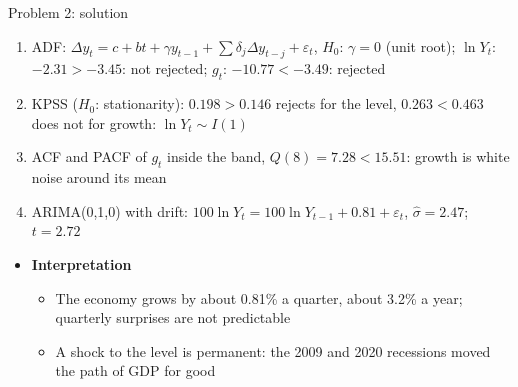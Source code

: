 \begin{frame}{Problem 2: solution}
\itemsize{\footnotesize}
\begin{enumerate}
    \item ADF: $\Delta y_t = c + bt + \gamma y_{t-1} + \sum\delta_j\Delta y_{t-j} + \varepsilon_t$, $H_0$: $\gamma = 0$ (unit root); $\ln Y_t$: $\ensuremath{-}2.31 > \ensuremath{-}3.45$: not rejected; $g_t$: $\ensuremath{-}10.77 < \ensuremath{-}3.49$: rejected
    \item KPSS ($H_0$: stationarity): $0.198 > 0.146$ rejects for the level, $0.263 < 0.463$ does not for growth: $\ln Y_t \sim I(1)$
    \item ACF and PACF of $g_t$ inside the band, $Q(8) = 7.28 < 15.51$: growth is white noise around its mean
    \item ARIMA(0,1,0) with drift: $100\ln Y_t = 100\ln Y_{t-1} + 0.81 + \varepsilon_t$, $\hat\sigma = 2.47$; $t = 2.72$
\end{enumerate}
\begin{itemize}
    \item \textbf{Interpretation}
    \begin{itemize}
        \item The economy grows by about 0.81\% a quarter, about 3.2\% a year; quarterly surprises are not predictable
        \item A shock to the level is permanent: the 2009 and 2020 recessions moved the path of GDP for good
    \end{itemize}
\end{itemize}
\end{frame}

